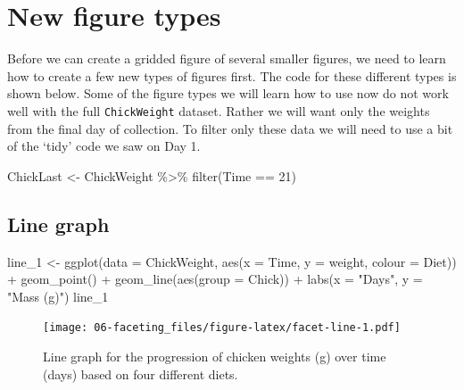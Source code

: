 \documentclass[
]{book}
\newenvironment{Shaded}{\begin{snugshade}}{\end{snugshade}}
\newcommand{\AttributeTok}[1]{\textcolor[rgb]{0.77,0.63,0.00}{#1}}
\newcommand{\DecValTok}[1]{\textcolor[rgb]{0.00,0.00,0.81}{#1}}
\newcommand{\FunctionTok}[1]{\textcolor[rgb]{0.00,0.00,0.00}{#1}}
\newcommand{\NormalTok}[1]{#1}
\newcommand{\OtherTok}[1]{\textcolor[rgb]{0.56,0.35,0.01}{#1}}
\newcommand{\SpecialCharTok}[1]{\textcolor[rgb]{0.00,0.00,0.00}{#1}}
\newcommand{\StringTok}[1]{\textcolor[rgb]{0.31,0.60,0.02}{#1}}
\begin{document}
\hypertarget{new-figure-types}{%
\section{New figure types}\label{new-figure-types}}

Before we can create a gridded figure of several smaller figures, we need to learn how to create a few new types of figures first. The code for these different types is shown below. Some of the figure types we will learn how to use now do not work well with the full \texttt{ChickWeight} dataset. Rather we will want only the weights from the final day of collection. To filter only these data we will need to use a bit of the `tidy' code we saw on Day 1.

\begin{Shaded}
\begin{Highlighting}[]
\NormalTok{ChickLast }\OtherTok{\textless{}{-}}\NormalTok{ ChickWeight }\SpecialCharTok{\%\textgreater{}\%} 
  \FunctionTok{filter}\NormalTok{(Time }\SpecialCharTok{==} \DecValTok{21}\NormalTok{)}
\end{Highlighting}
\end{Shaded}

\hypertarget{line-graph}{%
\subsection{Line graph}\label{line-graph}}

\begin{Shaded}
\begin{Highlighting}[]
\NormalTok{line\_1 }\OtherTok{\textless{}{-}} \FunctionTok{ggplot}\NormalTok{(}\AttributeTok{data =}\NormalTok{ ChickWeight, }\FunctionTok{aes}\NormalTok{(}\AttributeTok{x =}\NormalTok{ Time, }\AttributeTok{y =}\NormalTok{ weight, }\AttributeTok{colour =}\NormalTok{ Diet)) }\SpecialCharTok{+}
  \FunctionTok{geom\_point}\NormalTok{() }\SpecialCharTok{+}
  \FunctionTok{geom\_line}\NormalTok{(}\FunctionTok{aes}\NormalTok{(}\AttributeTok{group =}\NormalTok{ Chick)) }\SpecialCharTok{+}
  \FunctionTok{labs}\NormalTok{(}\AttributeTok{x =} \StringTok{"Days"}\NormalTok{, }\AttributeTok{y =} \StringTok{"Mass (g)"}\NormalTok{)}
\NormalTok{line\_1}
\end{Highlighting}
\end{Shaded}

\begin{figure}
\centering
\texttt{[image: 06-faceting\_files/figure-latex/facet-line-1.pdf]}
\caption{\label{fig:facet-line}Line graph for the progression of chicken weights (g) over time (days) based on four different diets.}
\end{figure}
\end{document}
